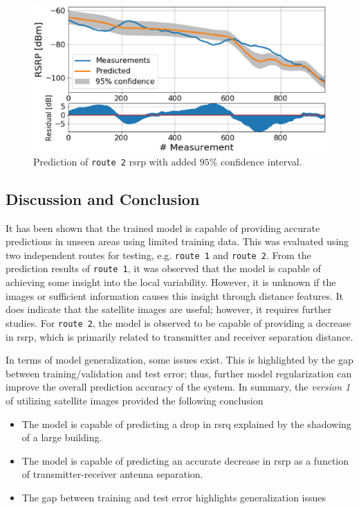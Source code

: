 \begin{figure}
    \centering
    \includegraphics{chapters/part_pathloss/drive_test_minimzation_paper/route_2_predictions_5ab708662d60543b24f857a1.eps}
    \caption{Prediction of \texttt{route 2} \gls{rsrp} with added $95\%$ confidence interval.}
    \label{fig:route_2_v1}
\end{figure}

\subsection{Discussion and Conclusion}
It has been shown that the trained model is capable of providing accurate predictions in unseen areas using limited training data. This was evaluated using two independent routes for testing, e.g. \texttt{route 1} and \texttt{route 2}. From the prediction results of \texttt{route 1}, it was observed that the model is capable of achieving some insight into the local variability. However, it is unknown if the images or sufficient information causes this insight through distance features. It does indicate that the satellite images are useful; however, it requires further studies. 
For \texttt{route 2}, the model is observed to be capable of providing a decrease in \gls{rsrp}, which is primarily related to transmitter and receiver separation distance. 

In terms of model generalization, some issues exist. This is highlighted by the gap between training/validation and test error; thus, further model regularization can improve the overall prediction accuracy of the system. In summary, the \emph{version 1} of utilizing satellite images provided the following conclusion

\begin{itemize}
    \item The model is capable of predicting a drop in \gls{rsrq} explained by the shadowing of a large building.
    \item The model is capable of predicting an accurate decrease in \gls{rsrp} as a function of transmitter-receiver antenna separation.
    \item The gap between training and test error highlights generalization issues
\end{itemize}


